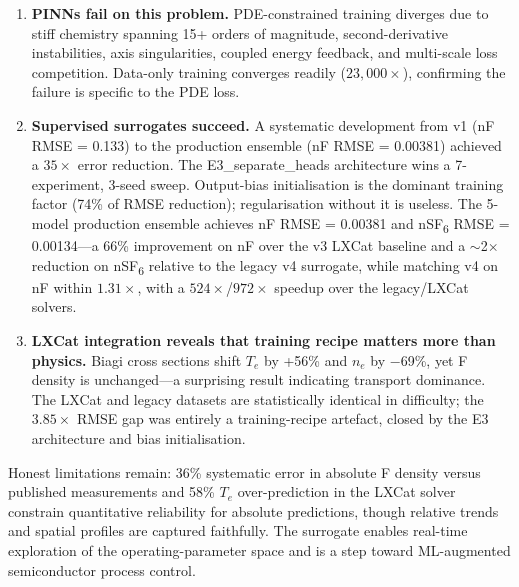 \documentclass[12pt,a4paper]{article}
\begin{document}
\begin{enumerate}
  \item \textbf{PINNs fail on this problem.}  PDE-constrained training
        diverges due to stiff chemistry spanning 15+ orders of
        magnitude, second-derivative instabilities, axis singularities,
        coupled energy feedback, and multi-scale loss competition.
        Data-only training converges readily ($23{,}000\times$),
        confirming the failure is specific to the PDE loss.

  \item \textbf{Supervised surrogates succeed.}  A systematic
        development from v1 (nF RMSE = 0.133) to the production
        ensemble (nF RMSE = 0.00381) achieved a $35\times$ error
        reduction.  The E3\_separate\_heads architecture wins a
        7-experiment, 3-seed sweep.  Output-bias initialisation is the
        dominant training factor (74\% of RMSE reduction);
        regularisation without it is useless.  The 5-model production
        ensemble achieves nF RMSE = 0.00381 and nSF\textsubscript{6}
        RMSE = 0.00134---a 66\% improvement on nF over the v3 LXCat
        baseline and a $\sim$2$\times$ reduction on
        nSF\textsubscript{6} relative to the legacy v4 surrogate,
        while matching v4 on nF within $1.31\times$, with a
        $524\times$/$972\times$ speedup over the legacy/LXCat solvers.

  \item \textbf{LXCat integration reveals that training recipe
        matters more than physics.}  Biagi cross sections shift $T_e$
        by +56\% and $n_e$ by $-$69\%, yet F density is unchanged---a
        surprising result indicating transport dominance.  The LXCat
        and legacy datasets are statistically identical in difficulty;
        the $3.85\times$ RMSE gap was entirely a training-recipe
        artefact, closed by the E3 architecture and bias
        initialisation.
\end{enumerate}

Honest limitations remain: 36\% systematic error in absolute F density
versus published measurements and 58\% $T_e$ over-prediction in the
LXCat solver constrain quantitative reliability for absolute
predictions, though relative trends and spatial profiles are captured
faithfully.  The surrogate enables real-time exploration of the
operating-parameter space and is a step toward ML-augmented
semiconductor process control.

\end{document}
